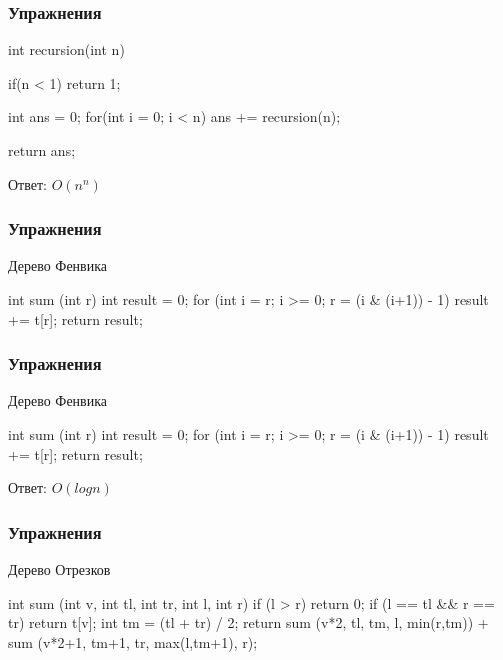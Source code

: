
\begin{frame}[fragile]
    \frametitle{Упражнения}
    
    \begin{cpp}
        int recursion(int n){
            if(n < 1){
                return 1;
            }

            int ans = 0;
            for(int i = 0; i < n){
                ans += recursion(n);
            }

            return ans;
        }
    \end{cpp}
    
    Ответ: $O(n^n)$
\end{frame}


\begin{frame}[fragile]
    \frametitle{Упражнения}
    
    Дерево Фенвика
    \begin{cpp}
        int sum (int r){
            int result = 0;
            for (int i = r; i >= 0; r = (i & (i+1)) - 1){
                result += t[r];
            }
            return result;
        }
    \end{cpp}
    
\end{frame}


\begin{frame}[fragile]
    \frametitle{Упражнения}
    
    Дерево Фенвика
    \begin{cpp}
        int sum (int r){
            int result = 0;
            for (int i = r; i >= 0; r = (i & (i+1)) - 1){
                result += t[r];
            }
            return result;
        }
    \end{cpp}
    
    Ответ: $O(log{n})$
\end{frame}


\begin{frame}[fragile]
    \frametitle{Упражнения}
    
    Дерево Отрезков
    \begin{cpp}
        int sum (int v, int tl, int tr, int l, int r) {
            if (l > r){
                return 0;
            }
            if (l == tl && r == tr){
                return t[v];
            }
            int tm = (tl + tr) / 2;
            return sum (v*2, tl, tm, l, min(r,tm))
            + sum (v*2+1, tm+1, tr, max(l,tm+1), r);
        }
    \end{cpp}
    
\end{frame}

